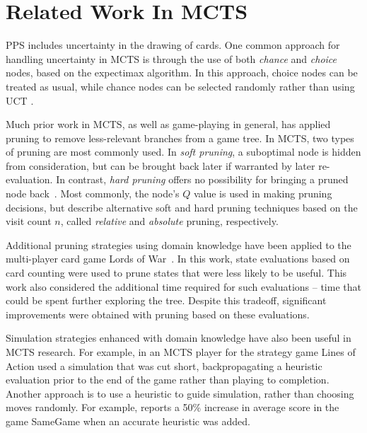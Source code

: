 \documentclass[letterpaper]{article}
\begin{document}
\section{Related Work In MCTS}
\label{relatedWork}

PPS includes uncertainty in the drawing of cards. One common approach for handling uncertainty in MCTS is through the use of both {\it chance} and {\it choice} nodes, based on the expectimax  algorithm. In this approach, choice nodes can be treated as usual, while chance nodes can be selected randomly rather than using UCT \cite{melko2007optimal,hauk2004search}.

Much prior work in MCTS, as well as game-playing in general, has applied pruning to remove less-relevant branches from a game tree. In MCTS, two types of pruning are most commonly used. In {\it soft pruning}, a suboptimal node is hidden from consideration, but can be brought back later if warranted by later re-evaluation. In contrast, {\it hard pruning} offers no possibility for bringing a pruned node back~\cite{browne2012survey}. Most commonly, the node's $Q$ value is used in making pruning decisions, but \cite{huang2010pruning} describe alternative soft and hard pruning techniques based on the visit count $n$, called {\it relative} and {\it absolute} pruning, respectively.

Additional pruning strategies using domain knowledge have been applied to the multi-player card game Lords of War~\cite{sephton2014ieee}. In this work, state evaluations based on card counting were used to prune states that were less likely to be useful. This work also considered the additional time required for such evaluations -- time that could be spent further exploring the tree. Despite this tradeoff, significant improvements were obtained with pruning based on these evaluations.

Simulation strategies enhanced with domain knowledge have also been useful in MCTS research. For example, in \cite{winands2010monte} an MCTS player for the strategy game Lines of Action used a simulation that was cut short, backpropagating a heuristic evaluation prior to the end of the game rather than playing to completion. Another approach is to use a heuristic to guide simulation, rather than choosing moves randomly. For example, \cite{schadd2012single} reports a 50\% increase in average score in the game SameGame when an accurate heuristic was added.

\end{document}

